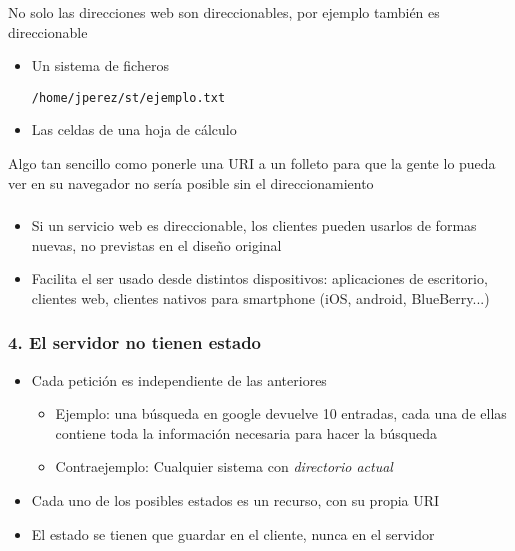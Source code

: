 \documentclass[ucs]{beamer}
\begin{document}
\begin{frame}[fragile]
\frametitle{}
No solo las direcciones web son direccionables, por ejemplo también es direccionable


\begin{itemize}
\item
Un sistema de ficheros 

  \begin{footnotesize}
  \begin{verbatim}
/home/jperez/st/ejemplo.txt
  \end{verbatim}
  \end{footnotesize}

\item
Las celdas de una hoja de cálculo
\end{itemize}

Algo tan sencillo como ponerle una URI a un folleto para que la gente lo
pueda ver en su navegador no sería posible sin el direccionamiento

\end{frame}


\begin{frame}[fragile]
\frametitle{}
\begin{itemize}
\item
Si un servicio web es direccionable, los clientes pueden usarlos de formas nuevas,
no previstas en el diseño original
\item
Facilita el ser usado desde distintos dispositivos: aplicaciones de escritorio, clientes
web, clientes nativos para smartphone (iOS, android, BlueBerry...)
\end{itemize}

\end{frame}


\begin{frame}[fragile]
\frametitle{4. El servidor no tienen estado}

\begin{itemize}
\item
Cada petición es independiente de las anteriores

\begin{itemize}
\item
Ejemplo: una búsqueda en google devuelve 10 entradas, cada una de ellas contiene toda la información necesaria para hacer la búsqueda

\item
Contraejemplo: Cualquier sistema con \emph{directorio actual}

\end{itemize}
\item
Cada uno de los posibles estados es un recurso, con su propia URI

\item
El estado se tienen que guardar en el cliente, nunca en el servidor
\end{itemize}
\end{frame}
\end{document}
